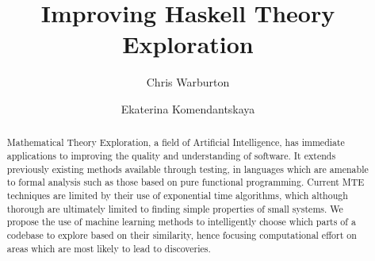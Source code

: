 \documentclass[]{article}
\begin{document}
\mainmatter  %

\title{Improving Haskell Theory Exploration}


%
%
\author{Chris Warburton%
\and Ekaterina Komendantskaya}
%


%
%

\maketitle

\begin{abstract}
  Mathematical Theory Exploration, a field of Artificial Intelligence, has
  immediate applications to improving the quality and understanding of software.
  It extends previously existing methods available through testing, in languages
  which are amenable to formal analysis such as those based on pure functional
  programming. Current MTE techniques are limited by their use of exponential
  time algorithms, which although thorough are ultimately limited to finding
  simple properties of small systems. We propose the use of machine learning
  methods to intelligently choose which parts of a codebase to explore based on
  their similarity, hence focusing computational effort on areas which are most
  likely to lead to discoveries.
\end{abstract}













\end{document}
